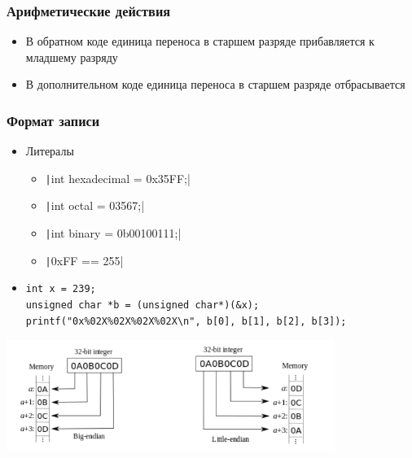 \documentclass[xetex,mathserif,serif]{beamer}
\begin{document}
    \begin{frame}
        \frametitle{Арифметические действия}
        \begin{itemize}
            \item В обратном коде единица переноса в старшем разряде прибавляется к младшему разряду
            \item В дополнительном коде единица переноса в старшем разряде отбрасывается
        \end{itemize}
    \end{frame}

    \begin{frame}[fragile]
        \frametitle{Формат записи}
        \begin{itemize}
            \item Литералы
            \begin{itemize}
                \item \texttt|int hexadecimal = 0x35FF;|
                \item \texttt|int octal = 03567;|
                \item \texttt|int binary = 0b00100111;|
                \item \texttt|0xFF == 255|
            \end{itemize}
            \item 
            \begin{footnotesize}
                \begin{verbatim}
int x = 239;
unsigned char *b = (unsigned char*)(&x);
printf("0x%02X%02X%02X%02X\n", b[0], b[1], b[2], b[3]);
                \end{verbatim}
            \end{footnotesize}
        \end{itemize}
        \begin{center}
            \includegraphics[width=0.8\textwidth]{little-endian-big-endian.png}
        \end{center}
    \end{frame}
\end{document}
